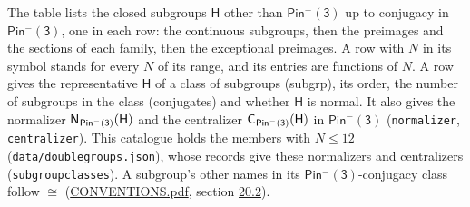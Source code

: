 \documentclass[10pt,a4paper]{article}
\numberwithin{equation}{section}
\newcommand{\grp}[1]{\mathsf{#1}}
\newcommand{\samecls}{\cong}
\newcommand{\hairsp}{\mkern1mu}
\begin{document}
\leavevmode\label{n:group.H}The table lists the closed subgroups $\grp{H}$ other than $\grp{Pin^{-}(3)}$ up to conjugacy in $\grp{Pin^{-}(3)}$, one in each row: the continuous subgroups, then the preimages and the sections of each family, then the exceptional preimages. A row with $N$ in its symbol stands for every $N$ of its range, and its entries are functions of $N$. \label{n:head.subgroup}\label{n:head.order}\label{n:head.conjugates}\label{n:head.normal}A row gives the representative $\grp{H}$ of a class of subgroups (subgrp), its order, the number of subgroups in the class (conjugates) and whether $\grp{H}$ is normal. \label{n:group.normalizer}\label{n:group.centralizer}It also gives the normalizer $\grp{N}_{\hairsp \grp{Pin^{-}(3)}}(\grp{H})$ and the centralizer $\grp{C}_{\hairsp \grp{Pin^{-}(3)}}(\grp{H})$ in $\grp{Pin^{-}(3)}$ (\texttt{normalizer}, \texttt{centralizer}). This catalogue holds the members with $N \le 12$ (\texttt{data/doublegroups.json}), whose records give these normalizers and centralizers (\texttt{subgroupclasses}). A subgroup's other names in its \href{Pinminus3.pdf}{$\grp{Pin^{-}(3)}$}-conjugacy class follow $\samecls$ (\href{../../CONVENTIONS.pdf}{CONVENTIONS.pdf}, section \href{../../CONVENTIONS.pdf\#conv.20.2}{20.2}).
\end{document}
